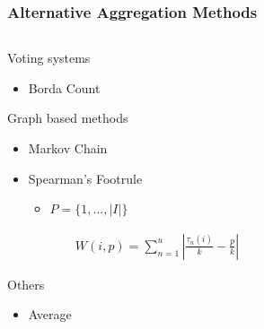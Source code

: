 \begin{frame}
\frametitle{Alternative Aggregation Methods}
\begin{columns}
	\begin{column}{0.5\textwidth}
		Voting systems
		\begin{itemize}
			\item Borda Count
		\end{itemize}
		Graph based methods
		\begin{itemize}
			\item Markov Chain 
			\item Spearman's Footrule
				\begin{itemize}
				\item $P = \{1, ..., |I|\}$
				\end{itemize}
			\begin{align*}
			W(i,p) = \displaystyle\sum_{n=1}^{u} |\frac{\tau_n(i)}{k} - \frac{p}{k}|
			\end{align*}
		\end{itemize}
		Others
		\begin{itemize}
			\item Average
		\end{itemize}
	\end{column}
	\begin{column}{0.5\textwidth}
		\begin{figure}
			\centering

\end{figure}
\end{column}
\end{columns}
\end{frame}
